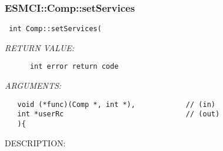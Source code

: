  
\setlength{\oldparskip}{\parskip}
\setlength{\parskip}{1.5ex}
\setlength{\oldparindent}{\parindent}
\setlength{\parindent}{0pt}
\setlength{\oldbaselineskip}{\baselineskip}
\setlength{\baselineskip}{11pt}
 
\def\bv{\begin{verbatim}}
\def\ev{\end{verbatim}}
\def\be{\begin{equation}}
\def\ee{\end{equation}}
\def\bea{\begin{eqnarray}}
\def\eea{\end{eqnarray}}
\def\bi{\begin{itemize}}
\def\ei{\end{itemize}}
\def\bn{\begin{enumerate}}
\def\en{\end{enumerate}}
\def\bd{\begin{description}}
\def\ed{\end{description}}
\def\({\left (}
\def\){\right )}
\def\[{\left [}
\def\]{\right ]}
\def\<{\left  \langle}
\def\>{\right \rangle}
\def\cI{{\cal I}}
\def\diag{\mathop{\rm diag}}
\def\tr{\mathop{\rm tr}}


 
\subsubsection [ESMCI::Comp::setServices] {ESMCI::Comp::setServices}


  
\begin{verbatim} int Comp::setServices(\end{verbatim}{\em RETURN VALUE:}
\begin{verbatim}      int error return code\end{verbatim}{\em ARGUMENTS:}
\begin{verbatim}   void (*func)(Comp *, int *),            // (in)
   int *userRc                             // (out)
   ){\end{verbatim}
{\sf DESCRIPTION:\\ }


